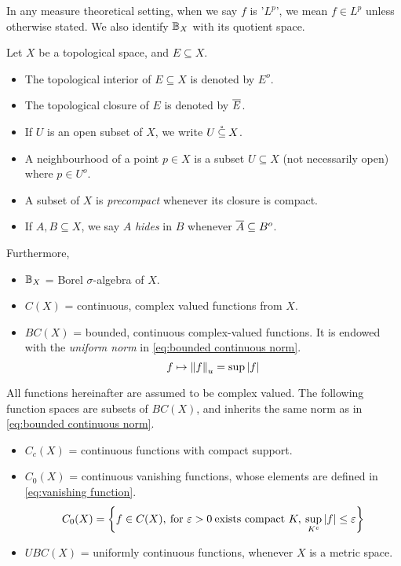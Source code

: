 \documentclass[../main-v2-manifolds.tex]{subfiles}
\begin{document}
\begin{remark}
    In any measure theoretical setting, when we say $f$ is '$L^p$', we mean $f\in L^p$ unless otherwise stated. We also identify ${\mathbb{B}}_X$ with its quotient space.
\end{remark}
Let $X$ be a topological space, and $E\subseteq X$.
\begin{itemize}
    \item The topological interior of $E\subseteq X$ is denoted by $E^o$.
    \item The topological closure of $E$ is denoted by $\overline{E}$.
    \item If $U$ is an open subset of $X$, we write $U\:\mathring{\subseteq}\: X$. 
    \item A neighbourhood of a point $p\in X$ is a subset $U\subseteq X$ (not necessarily open) where $p\in U^o$.
    \item A subset of $X$ is \emph{precompact} whenever its closure is compact.
    \item If $A,B\subseteq X$, we say $A$ \emph{hides} in $B$ whenever $\overline{A}\subseteq B^o$.
\end{itemize}    
Furthermore, 
\begin{itemize}
    \item ${\mathbb{B}}_X$ = Borel $\sigma$-algebra of $X$.
    \item $C(X)$ = continuous, complex valued functions from $X$.
    \item $BC(X)$ = bounded, continuous complex-valued functions. It is endowed with the \emph{uniform norm} in \cref{eq:bounded continuous norm}.
    \begin{equation}
        f\mapsto \norm{f}_u = \sup \vert {f} \vert
        \label{eq:bounded continuous norm}
    \end{equation}
\end{itemize}
All functions hereinafter are assumed to be complex valued. The following function spaces are subsets of $BC(X)$, and inherits the same norm as in \cref{eq:bounded continuous norm}.
\begin{itemize}
    \item $C_c(X)$ = continuous functions with compact support. 
    \item $C_0(X)$ = continuous vanishing functions, whose elements are defined in \cref{eq:vanishing function}. 
    \begin{equation}
        C_0(X) = \biggl\{{f\in C(X),\: \text{for }\varepsilon>0\: \text{exists compact } K,\: \sup_{K^c}\vert {f} \vert\leq\varepsilon}\biggr\}
        \label{eq:vanishing function}
    \end{equation}
    \item $UBC(X)$ = uniformly continuous functions, whenever $X$ is a metric space.
\end{itemize}
\end{document}

